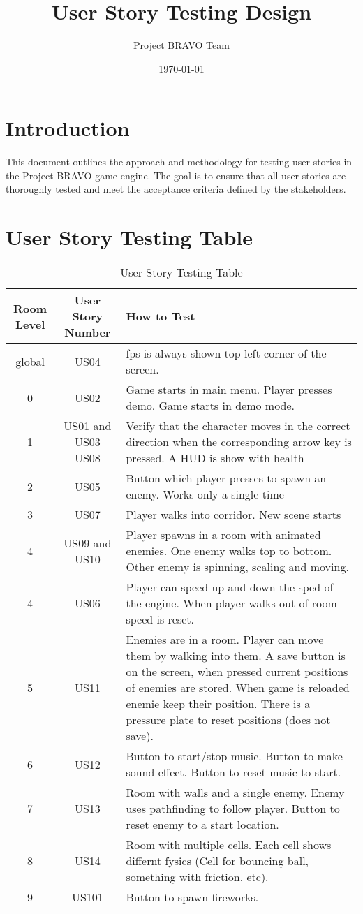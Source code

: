 \documentclass{article}
\title{User Story Testing Design}
\author{Project BRAVO Team}
\date{\today}
\begin{document}
\maketitle

\section{Introduction}
This document outlines the approach and methodology for testing user stories in the Project BRAVO game engine. The goal is to ensure that all user stories are thoroughly tested and meet the acceptance criteria defined by the stakeholders.

\section{User Story Testing Table}

\begin{table}[h!]
\centering
\begin{tabular}{|c|c|p{8cm}|}
\hline
\textbf{Room Level} & \textbf{User Story Number} & \textbf{How to Test} \\
\hline
global & US04 & fps is always shown top left corner of the screen. \\
\hline
0 & US02 & Game starts in main menu. Player presses demo. Game starts in demo mode. \\
\hline
1 & US01 and US03 US08 & Verify that the character moves in the correct direction when the corresponding arrow key is pressed. A HUD is show with health \\
\hline
2 & US05 & Button which player presses to spawn an enemy. Works only a single time \\
\hline
3 & US07 & Player walks into corridor. New scene starts \\
\hline
4 & US09 and US10 & Player spawns in a room with animated enemies. One enemy walks top to bottom. Other enemy is spinning, scaling and moving. \\
\hline
4 & US06 & Player can speed up and down the sped of the engine. When player walks out of room speed is reset. \\
\hline
5 & US11 & Enemies are in a room. Player can move them by walking into them. A save button is on the screen, when pressed current positions of enemies are stored. When game is reloaded enemie keep their position. There is a pressure plate to reset positions (does not save). \\
\hline
6 & US12 & Button to start/stop music. Button to make sound effect. Button to reset music to start. \\
\hline
7 & US13 & Room with walls and a single enemy. Enemy uses pathfinding to follow player. Button to reset enemy to a start location. \\
\hline
8 & US14 & Room with multiple cells. Each cell shows differnt fysics (Cell for bouncing ball, something with friction, etc). \\
\hline
9 & US101 & Button to spawn fireworks. \\
\hline
\end{tabular}
\caption{User Story Testing Table}
\label{tab:user_story_testing}
\end{table}
\end{document}
